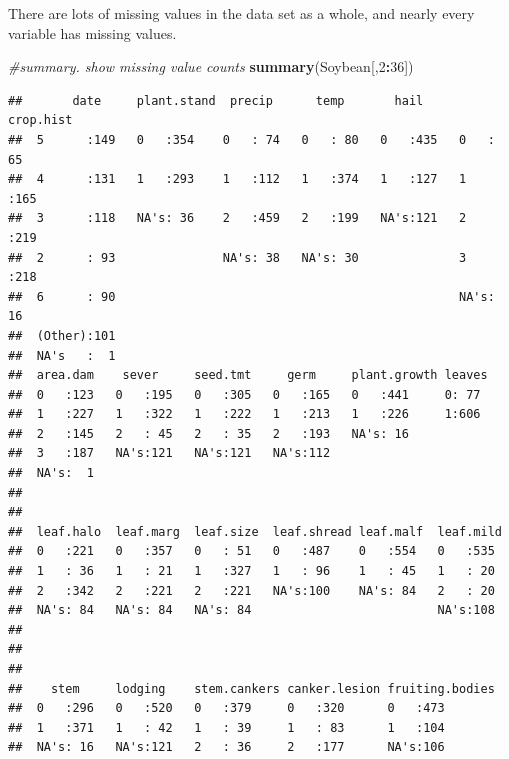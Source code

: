 \documentclass[]{book}
\newenvironment{Shaded}{\begin{snugshade}}{\end{snugshade}}
\newcommand{\CommentTok}[1]{\textcolor[rgb]{0.56,0.35,0.01}{\textit{#1}}}
\newcommand{\DecValTok}[1]{\textcolor[rgb]{0.00,0.00,0.81}{#1}}
\newcommand{\KeywordTok}[1]{\textcolor[rgb]{0.13,0.29,0.53}{\textbf{#1}}}
\newcommand{\NormalTok}[1]{#1}
\newcommand{\OperatorTok}[1]{\textcolor[rgb]{0.81,0.36,0.00}{\textbf{#1}}}
\begin{document}
There are lots of missing values in the data set as a whole, and nearly every variable has missing values.

\begin{Shaded}
\begin{Highlighting}[]
\CommentTok{#summary.  show missing value counts}
\KeywordTok{summary}\NormalTok{(Soybean[,}\DecValTok{2}\OperatorTok{:}\DecValTok{36}\NormalTok{])}
\end{Highlighting}
\end{Shaded}

\begin{verbatim}
##       date     plant.stand  precip      temp       hail     crop.hist 
##  5      :149   0   :354    0   : 74   0   : 80   0   :435   0   : 65  
##  4      :131   1   :293    1   :112   1   :374   1   :127   1   :165  
##  3      :118   NA's: 36    2   :459   2   :199   NA's:121   2   :219  
##  2      : 93               NA's: 38   NA's: 30              3   :218  
##  6      : 90                                                NA's: 16  
##  (Other):101                                                          
##  NA's   :  1                                                          
##  area.dam    sever     seed.tmt     germ     plant.growth leaves 
##  0   :123   0   :195   0   :305   0   :165   0   :441     0: 77  
##  1   :227   1   :322   1   :222   1   :213   1   :226     1:606  
##  2   :145   2   : 45   2   : 35   2   :193   NA's: 16            
##  3   :187   NA's:121   NA's:121   NA's:112                       
##  NA's:  1                                                        
##                                                                  
##                                                                  
##  leaf.halo  leaf.marg  leaf.size  leaf.shread leaf.malf  leaf.mild 
##  0   :221   0   :357   0   : 51   0   :487    0   :554   0   :535  
##  1   : 36   1   : 21   1   :327   1   : 96    1   : 45   1   : 20  
##  2   :342   2   :221   2   :221   NA's:100    NA's: 84   2   : 20  
##  NA's: 84   NA's: 84   NA's: 84                          NA's:108  
##                                                                    
##                                                                    
##                                                                    
##    stem     lodging    stem.cankers canker.lesion fruiting.bodies
##  0   :296   0   :520   0   :379     0   :320      0   :473       
##  1   :371   1   : 42   1   : 39     1   : 83      1   :104       
##  NA's: 16   NA's:121   2   : 36     2   :177      NA's:106       

\end{verbatim}
\end{document}
